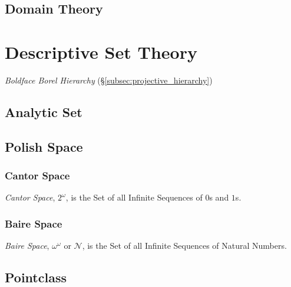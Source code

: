 \documentclass{article}
\begin{document}
\subsection{Domain Theory}\label{subsec:domain_theory}



\section{Descriptive Set Theory}

\emph{Boldface Borel Hierarchy} (\S\ref{subsec:projective_hierarchy})

\subsection{Analytic Set}\label{subsec:analytic_set}

\subsection{Polish Space}\label{subsec:polish_space}

\subsubsection{Cantor Space}

\emph{Cantor Space}, $2^{\omega}$, is the Set of all Infinite
Sequences of $0$s and $1$s.



\subsubsection{Baire Space}

\emph{Baire Space}, $\omega^{\omega}$ or $\mathcal{N}$, is the Set of
all Infinite Sequences of Natural Numbers.



\subsection{Pointclass}\label{subsec:pointclass}
\end{document}
